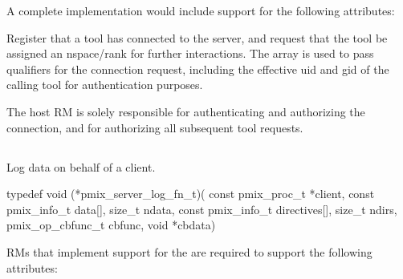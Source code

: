 \optattr
A complete implementation would include support for the following attributes:



\descr

Register that a tool has connected to the server, and request that the tool be assigned an nspace/rank for further interactions.
The  array is used to pass qualifiers for the connection request, including the effective uid and gid of the calling tool for authentication purposes.

\adviceimplstart
The host \ac{RM} is solely responsible for authenticating and authorizing the connection, and for authorizing all subsequent tool requests.
\adviceimplend


\subsection{}

\summary

Log data on behalf of a client.

\format

\cspecificstart
\begin{codepar}
typedef void (*pmix_server_log_fn_t)(
                    const pmix_proc_t *client,
                    const pmix_info_t data[], size_t ndata,
                    const pmix_info_t directives[], size_t ndirs,
                    pmix_op_cbfunc_t cbfunc, void *cbdata)
\end{codepar}
\cspecificend

\begin{arglist}
\end{arglist}


\reqattr
\acp{RM} that implement support for the  are required to support the following attributes:


